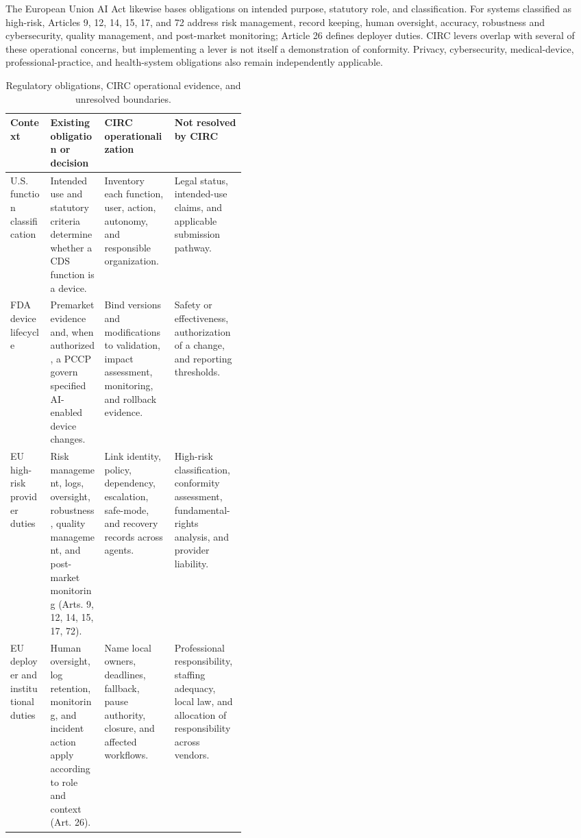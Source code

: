 \documentclass[10pt]{article}
\begin{document}
The European Union AI Act likewise bases obligations on intended purpose, statutory role, and
classification. For systems classified as high-risk, Articles 9, 12, 14, 15, 17, and 72 address risk
management, record keeping, human oversight, accuracy, robustness and cybersecurity, quality
management, and post-market monitoring; Article 26 defines deployer duties.\cite{eu2024aiact} CIRC
levers overlap with several of these operational concerns, but implementing a lever is not itself a
demonstration of conformity. Privacy, cybersecurity, medical-device, professional-practice, and
health-system obligations also remain independently applicable.

\begin{table}[htbp]
\centering
\caption{Regulatory obligations, CIRC operational evidence, and unresolved boundaries.}
\label{tab:regulatory-boundary}
\footnotesize
\begin{tabularx}{\linewidth}{B{0.17\linewidth}p{0.23\linewidth}YY}
\toprule
Context & Existing obligation or decision & CIRC operationalization & Not resolved by CIRC \\
\midrule
U.S. function classification & Intended use and statutory criteria determine whether a CDS function
is a device. & Inventory each function, user, action, autonomy, and responsible organization. & Legal
status, intended-use claims, and applicable submission pathway. \\
FDA device lifecycle & Premarket evidence and, when authorized, a PCCP govern specified AI-enabled
device changes. & Bind versions and modifications to validation, impact assessment, monitoring, and
rollback evidence. & Safety or effectiveness, authorization of a change, and reporting thresholds. \\
EU high-risk provider duties & Risk management, logs, oversight, robustness, quality management, and
post-market monitoring (Arts. 9, 12, 14, 15, 17, 72). & Link identity, policy, dependency, escalation,
safe-mode, and recovery records across agents. & High-risk classification, conformity assessment,
fundamental-rights analysis, and provider liability. \\
EU deployer and institutional duties & Human oversight, log retention, monitoring, and incident action
apply according to role and context (Art. 26). & Name local owners, deadlines, fallback, pause
authority, closure, and affected workflows. & Professional responsibility, staffing adequacy, local
law, and allocation of responsibility across vendors. \\
\bottomrule
\end{tabularx}
\end{table}
\FloatBarrier
\end{document}
